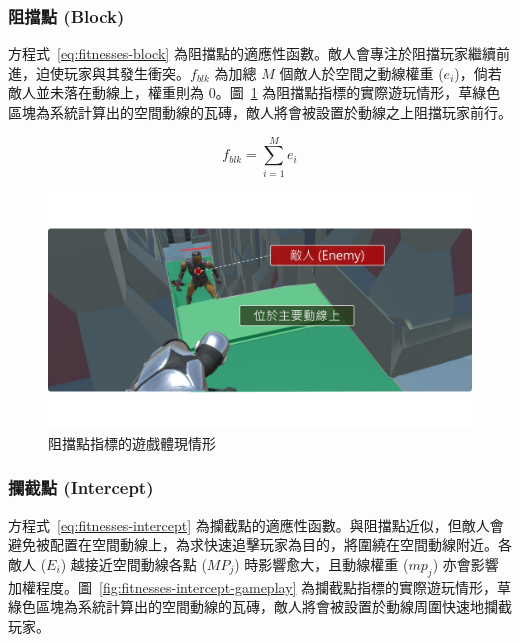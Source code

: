 \subsubsection{阻擋點 (Block)}
\label{sssec:method-segments-fitnesses-block}

方程式~\ref{eq:fitnesses-block} 為阻擋點的適應性函數。敵人會專注於阻擋玩家繼續前進，迫使玩家與其發生衝突。$f_{blk}$ 為加總 $M$ 個敵人於空間之動線權重 ($e_{i}$)，倘若敵人並未落在動線上，權重則為 $0$。圖~\ref{fig:fitnesses-block-gameplay} 為阻擋點指標的實際遊玩情形，草綠色區塊為系統計算出的空間動線的瓦磚，敵人將會被設置於動線之上阻擋玩家前行。

\begin{equation}
    \label{eq:fitnesses-block}
    f_{blk} = \sum_{i=1}^{M} e_{i}
\end{equation}

\begin{figure}[!htb]
  \begin{center}
    \includegraphics[width=1.0\textwidth]{figures/fitnesses-block-gameplay.pdf}
    \caption{阻擋點指標的遊戲體現情形}
    \label{fig:fitnesses-block-gameplay}
  \end{center}
\end{figure}

\subsubsection{攔截點 (Intercept)}
\label{sssec:method-segments-fitnesses-intercept}

方程式~\ref{eq:fitnesses-intercept} 為攔截點的適應性函數。與阻擋點近似，但敵人會避免被配置在空間動線上，為求快速追擊玩家為目的，將圍繞在空間動線附近。各敵人 ($E_{i}$) 越接近空間動線各點 ($MP_{j}$) 時影響愈大，且動線權重 ($mp_{j}$) 亦會影響加權程度。圖~\ref{fig:fitnesses-intercept-gameplay} 為攔截點指標的實際遊玩情形，草綠色區塊為系統計算出的空間動線的瓦磚，敵人將會被設置於動線周圍快速地攔截玩家。

